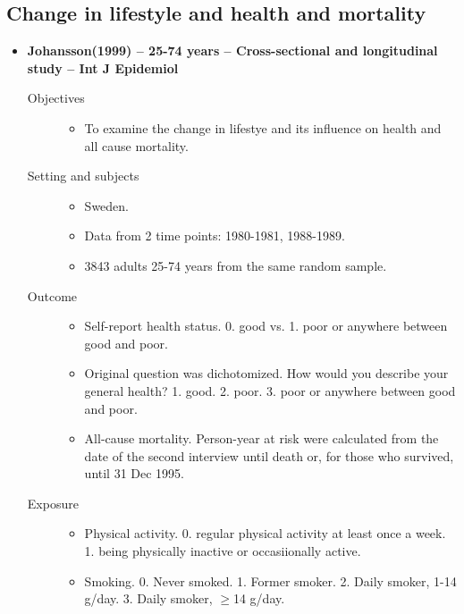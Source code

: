 \documentclass{article}
\begin{document}
\subsection{Change in lifestyle and health and mortality}
\begin{itemize}
	\item{\bf Johansson(1999) -- 25-74 years -- Cross-sectional and longitudinal study -- Int J Epidemiol} 
		\begin{description}
			\item[Objectives]\mbox{}\par
				\begin{itemize}
					\item To examine the change in lifestye and its influence on health and all cause mortality.
				\end{itemize}
			\item[Setting and subjects]\mbox{}\par 
				\begin{itemize}
					\item Sweden. 
					\item Data from 2 time points: 1980-1981, 1988-1989.
					\item 3843 adults 25-74 years from the same random sample.
				\end{itemize}
			\item[Outcome]\mbox{}\par
				\begin{itemize}
					\item Self-report health status. 0. good vs. 1. poor or anywhere between good and poor.
					\item Original question was dichotomized. How would you describe your general health? 1. good. 2. poor. 3. poor or anywhere between good and poor.
					\item All-cause mortality. Person-year at risk were calculated from the date of the second interview until death or, for those who survived, until 31 Dec 1995.
				\end{itemize}
			\item[Exposure] \mbox{}\par
				\begin{itemize}
					\item Physical activity. 0. regular physical  activity at least once a week. 1. being physically inactive or occasiionally active. 
					\item Smoking. 0. Never smoked. 1. Former smoker. 2. Daily smoker, 1-14 g/day. 3. Daily smoker, $\ge$14 g/day.

\end{itemize}
\end{description}
\end{itemize}
\end{document}
